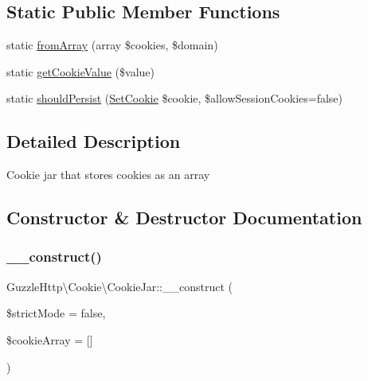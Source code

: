 \subsection*{Static Public Member Functions}
\begin{DoxyCompactItemize}
\item 
static \hyperlink{classGuzzleHttp_1_1Cookie_1_1CookieJar_a0b7ee1f3fe1391f68817393568051671}{from\+Array} (array \$cookies, \$domain)
\item 
static \hyperlink{classGuzzleHttp_1_1Cookie_1_1CookieJar_a6774ce1a8f02306aef22ce72db15921b}{get\+Cookie\+Value} (\$value)
\item 
static \hyperlink{classGuzzleHttp_1_1Cookie_1_1CookieJar_a0d462d85e5bb53da6b8a8654d5d4db28}{should\+Persist} (\hyperlink{classGuzzleHttp_1_1Cookie_1_1SetCookie}{Set\+Cookie} \$cookie, \$allow\+Session\+Cookies=false)
\end{DoxyCompactItemize}


\subsection{Detailed Description}
Cookie jar that stores cookies as an array 

\subsection{Constructor \& Destructor Documentation}
\mbox{\label{classGuzzleHttp_1_1Cookie_1_1CookieJar_a0c8c9443bcb9bfeccaad84763ddc6ba3}} 
\subsubsection{\texorpdfstring{\+\_\+\+\_\+construct()}{\_\_construct()}}
{\footnotesize\ttfamily Guzzle\+Http\textbackslash{}\+Cookie\textbackslash{}\+Cookie\+Jar\+::\+\_\+\+\_\+construct (\begin{DoxyParamCaption}\item[{}]{\$strict\+Mode = {\ttfamily false},  }\item[{}]{\$cookie\+Array = {\ttfamily \mbox{[}\mbox{]}} }\end{DoxyParamCaption})}


